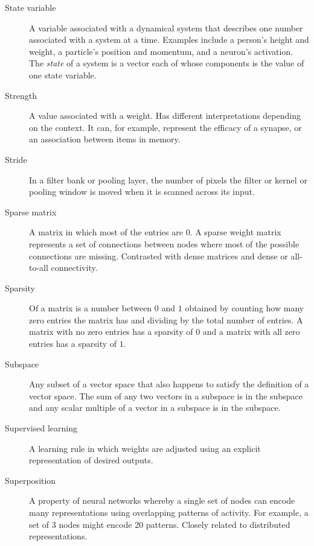 \begin{description}
\item[State variable] A variable associated with a dynamical system that describes one number associated with a system at a time. Examples include a person's height and weight, a particle's position and momentum, and a neuron's activation. The \emph{state} of a system is a vector each of whose components is the value of one state variable. 


\item[Strength] A value associated with a weight. Has different interpretations depending on the context. It can, for example, represent the efficacy of a synapse, or an association between items in memory.

\item[Stride] In a filter bank or pooling layer, the number of pixels the filter or kernel or pooling window is moved when it is scanned across its input.


\item[Sparse matrix] A matrix in which most of the entries are 0. A sparse weight matrix represents a set of connections between nodes where most of the possible connections are missing. Contrasted with dense matrices and dense or all-to-all connectivity. 

\item[Sparsity] Of a matrix is a number between $0$ and $1$ obtained by counting how many zero entries the matrix has and dividing by the total number of entries. A matrix with no zero entries has a sparsity of $0$ and a matrix with all zero entries has a sparsity of $1$.

\item[Subspace] Any subset of a vector space that also happens to satisfy the definition of a vector space. The sum of any two vectors in a subspace is in the subspace and any scalar multiple of a vector in a subspace is in the subspace.

\item[Supervised learning] A learning rule in which weights are adjusted using an explicit representation of desired outputs.

\item[Superposition] A property of neural networks whereby a single set of nodes can encode many representations using overlapping patterns of activity.  For example, a set of 3 nodes might encode 20 patterns. Closely related to distributed representations. 


\end{description}
